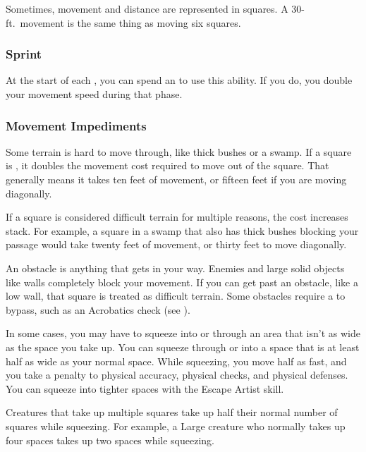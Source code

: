             Sometimes, movement and distance are represented in squares.
            A 30-ft.\ movement is the same thing as moving six squares.

        \subsubsection{Sprint}\label{Sprint}

            At the start of each , you can spend an  to use this ability.
            If you do, you double your movement speed during that phase.

        \subsubsection{Movement Impediments}

            \label{Difficult Terrain}
            Some terrain is hard to move through, like thick bushes or a swamp.
            If a square is , it doubles the movement cost required to move out of the square.
            That generally means it takes ten feet of movement, or fifteen feet if you are moving diagonally.

            If a square is considered difficult terrain for multiple reasons, the cost increases stack.
            For example, a square in a swamp that also has thick bushes blocking your passage would take twenty feet of movement, or thirty feet to move diagonally.

            An obstacle is anything that gets in your way. Enemies and large solid objects like walls completely block your movement. If you can get past an obstacle, like a low wall, that square is treated as difficult terrain. Some obstacles require a  to bypass, such as an Acrobatics check (see ).

            \label{Squeezing}
            In some cases, you may have to squeeze into or through an area that isn't as wide as the space you take up. You can squeeze through or into a space that is at least half as wide as your normal space. While squeezing, you move half as fast, and you take a  penalty to physical accuracy, physical checks, and physical defenses. You can squeeze into tighter spaces with the Escape Artist skill.

            Creatures that take up multiple squares take up half their normal number of squares while squeezing. For example, a Large creature who normally takes up four spaces takes up two spaces while squeezing.


